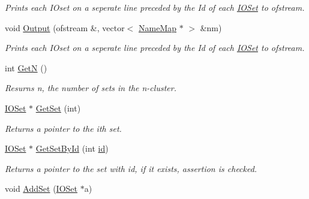 \begin{DoxyCompactItemize}
\begin{DoxyCompactList}\small\item\em Prints each IOset on a seperate line preceded by the Id of each \hyperlink{class_i_o_set}{IOSet} to ofstream. \item\end{DoxyCompactList}\item 
void \hyperlink{class_n_cluster_a5f75034c596cda89b823bb842f54019e}{Output} (ofstream \&, vector$<$ \hyperlink{class_name_map}{NameMap} $\ast$ $>$ \&nm)
\begin{DoxyCompactList}\small\item\em Prints each IOset on a seperate line preceded by the Id of each \hyperlink{class_i_o_set}{IOSet} to ofstream. \item\end{DoxyCompactList}\item 
\hypertarget{class_n_cluster_a5e91f8c38a0122031c3f921b94e3a688}{
int \hyperlink{class_n_cluster_a5e91f8c38a0122031c3f921b94e3a688}{GetN} ()}
\label{class_n_cluster_a5e91f8c38a0122031c3f921b94e3a688}

\begin{DoxyCompactList}\small\item\em Resurns n, the number of sets in the n-\/cluster. \item\end{DoxyCompactList}\item 
\hypertarget{class_n_cluster_a7d197e1cf217fe1ce95b0ba0b4ee40bc}{
\hyperlink{class_i_o_set}{IOSet} $\ast$ \hyperlink{class_n_cluster_a7d197e1cf217fe1ce95b0ba0b4ee40bc}{GetSet} (int)}
\label{class_n_cluster_a7d197e1cf217fe1ce95b0ba0b4ee40bc}

\begin{DoxyCompactList}\small\item\em Returns a pointer to the ith set. \item\end{DoxyCompactList}\item 
\hypertarget{class_n_cluster_a5d4ddbb124fc5d9c9cc706312ec80476}{
\hyperlink{class_i_o_set}{IOSet} $\ast$ \hyperlink{class_n_cluster_a5d4ddbb124fc5d9c9cc706312ec80476}{GetSetById} (int \hyperlink{class_n_cluster_a9360cadd4e338b91de61f86997acc890}{id})}
\label{class_n_cluster_a5d4ddbb124fc5d9c9cc706312ec80476}

\begin{DoxyCompactList}\small\item\em Returns a pointer to the set with id, if it exists, assertion is checked. \item\end{DoxyCompactList}\item 
\hypertarget{class_n_cluster_af4eeecc0717c16ffaa931a0100739f31}{
void \hyperlink{class_n_cluster_af4eeecc0717c16ffaa931a0100739f31}{AddSet} (\hyperlink{class_i_o_set}{IOSet} $\ast$a)}
\label{class_n_cluster_af4eeecc0717c16ffaa931a0100739f31}


\end{DoxyCompactItemize}
